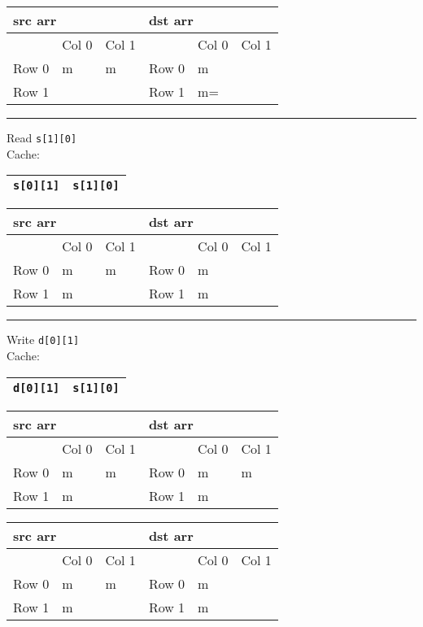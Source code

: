 \noindent
\begin{tabular}{llllll}
\multicolumn{3}{l}{src arr} & \multicolumn{3}{l}{dst arr} \\ \hline
        & Col 0   & Col 1   &         & Col 0   & Col 1   \\ \hline
Row 0   & m       & m       & Row 0   & m       &         \\
Row 1   &         &         & Row 1   & m=      &        
\end{tabular}

\noindent
\rule{\textwidth}{1pt}
Read \verb+s[1][0]+\\
Cache:
\begin{tabular}{|l|l|}
\hline
\verb+s[0][1]+ & \verb+s[1][0]+ \\ \hline
\end{tabular}


\noindent
\begin{tabular}{llllll}
\multicolumn{3}{l}{src arr} & \multicolumn{3}{l}{dst arr} \\ \hline
        & Col 0   & Col 1   &         & Col 0   & Col 1   \\ \hline
Row 0   & m       & m       & Row 0   & m       &         \\
Row 1   & m       &         & Row 1   & m       &        
\end{tabular}

\noindent
\rule{\textwidth}{1pt}
Write \verb+d[0][1]+\\
Cache:
\begin{tabular}{|l|l|}
\hline
\verb+d[0][1]+ & \verb+s[1][0]+ \\ \hline
\end{tabular}


\noindent
\begin{tabular}{llllll}
\multicolumn{3}{l}{src arr} & \multicolumn{3}{l}{dst arr} \\ \hline
        & Col 0   & Col 1   &         & Col 0   & Col 1   \\ \hline
Row 0   & m       & m       & Row 0   & m       & m       \\
Row 1   & m       &         & Row 1   & m       &        
\end{tabular}

\noindent
\begin{tabular}{llllll}
\multicolumn{3}{l}{src arr} & \multicolumn{3}{l}{dst arr} \\ \hline
        & Col 0   & Col 1   &         & Col 0   & Col 1   \\ \hline
Row 0   & m       & m       & Row 0   & m       &         \\
Row 1   & m       &         & Row 1   & m       &        
\end{tabular}

